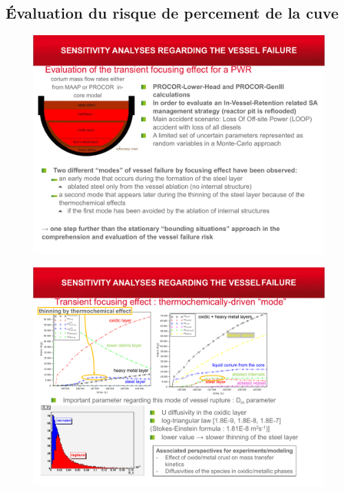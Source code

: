 \subsection{Évaluation du risque de percement de la cuve}
\begin{frame}[fragile]
	\baselineskip
	\begin{figure}[H]
	\centering \includegraphics[height=\textheight]{Figures/procor_1.pdf} 
	\end{figure}
\end{frame}
\begin{frame}[fragile]
	\baselineskip
	\begin{figure}[H]
	\centering \includegraphics[height=\textheight]{Figures/procor_2.pdf} 
	\end{figure}
\end{frame}
